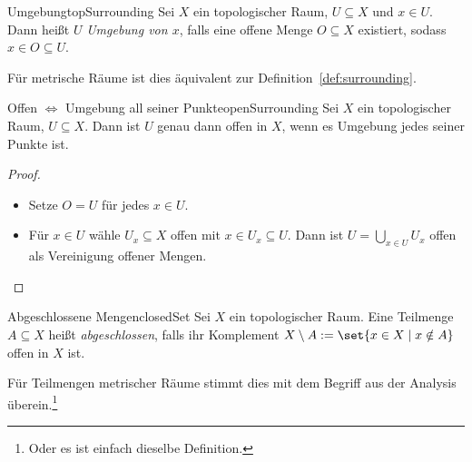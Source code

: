 \documentclass[language=ngerman]{TemplateLecture} %
\begin{document}
\begin{defi}{Umgebung}{topSurrounding}
    Sei $X$ ein topologischer Raum, $U \subseteq X$ und $x \in U$. Dann heißt $U$ \emph{Umgebung von $x$}, falls eine offene Menge $O \subseteq X$ existiert, sodass $x \in O \subseteq U$.
\end{defi}

\begin{remark}
    Für metrische Räume ist dies äquivalent zur Definition~\ref{def:surrounding}.
\end{remark}

\begin{thm}{Offen $\Leftrightarrow$ Umgebung all seiner Punkte}{openSurrounding}
    Sei $X$ ein topologischer Raum, $U \subseteq X$. Dann ist $U$ genau dann offen in $X$, wenn es Umgebung jedes seiner Punkte ist.
\end{thm}
\begin{proof}
    \begin{itemize}
        \item[\enquote{$\Rightarrow$}] Setze $O = U$ für jedes $x \in U$.
        \item[\enquote{$\Leftarrow$}] Für $x \in U$ wähle $U_x \subseteq X$ offen mit $x \in U_x \subseteq U$. Dann ist 
        $U = \bigcup_{x \in U} U_x$ offen als Vereinigung offener Mengen.
    \end{itemize}
\end{proof}

\begin{defi}{Abgeschlossene Mengen}{closedSet}
    Sei $X$ ein topologischer Raum. Eine Teilmenge $A \subseteq X$ heißt \emph{abgeschlossen}, falls ihr Komplement $X \setminus A := \set{x \in X \mid x \notin A}$ offen in $X$ ist.
\end{defi}
\begin{remark}
    Für Teilmengen metrischer Räume stimmt dies mit dem Begriff aus der Analysis überein.\footnote{Oder es ist einfach dieselbe Definition.}
\end{remark}



\end{document}
